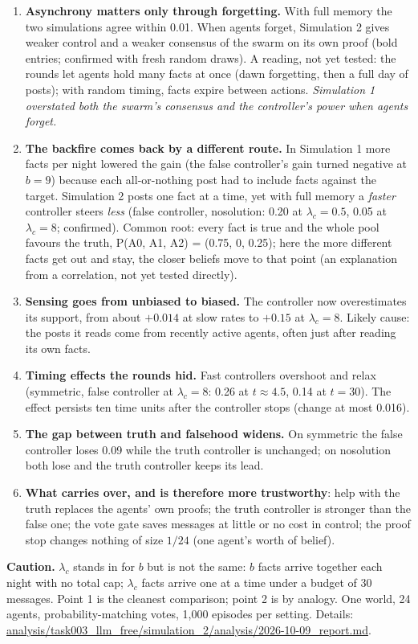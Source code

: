 \documentclass[10pt,a4paper]{article}
\begin{document}
\begin{enumerate}[label=\textbf{\arabic*.}]
\item \textbf{Asynchrony matters only through forgetting.} With full memory the two
  simulations agree within 0.01. When agents forget, Simulation 2 gives weaker control and a
  weaker consensus of the swarm on its own proof (bold entries; confirmed with fresh random
  draws). A reading, not yet tested: the rounds let agents hold many facts at once (dawn
  forgetting, then a full day of posts); with random timing, facts expire between actions.
  \emph{Simulation 1 overstated both the swarm's consensus and the controller's power when
  agents forget.}
\item \textbf{The backfire comes back by a different route.} In Simulation 1 more facts per
  night lowered the gain (the false controller's gain turned negative at $b = 9$) because each
  all-or-nothing post had to include facts against the target. Simulation 2 posts one fact at a
  time, yet with full memory a \emph{faster} controller steers \emph{less} (false controller,
  nosolution: 0.20 at $\lambda_c = 0.5$, 0.05 at $\lambda_c = 8$; confirmed). Common root: every
  fact is true and the whole pool favours the truth, P(A0, A1, A2) = (0.75, 0, 0.25); here the
  more different facts get out and stay, the closer beliefs move to that point (an explanation
  from a correlation, not yet tested directly).
\item \textbf{Sensing goes from unbiased to biased.} The controller now overestimates its
  support, from about $+0.014$ at slow rates to $+0.15$ at $\lambda_c = 8$. Likely cause: the
  posts it reads come from recently active agents, often just after reading its own facts.
\item \textbf{Timing effects the rounds hid.} Fast controllers overshoot and relax (symmetric,
  false controller at $\lambda_c = 8$: 0.26 at $t \approx 4.5$, 0.14 at $t = 30$). The effect
  persists ten time units after the controller stops (change at most 0.016).
\item \textbf{The gap between truth and falsehood widens.} On symmetric the false controller
  loses 0.09 while the truth controller is unchanged; on nosolution both lose and the truth
  controller keeps its lead.
\item \textbf{What carries over, and is therefore more trustworthy}: help with the truth
  replaces the agents' own proofs; the truth controller is stronger than the false one; the
  vote gate saves messages at little or no cost in control; the proof stop changes nothing
  of size $1/24$ (one agent's worth of belief).
\end{enumerate}

\noindent\textbf{Caution.} $\lambda_c$ stands in for $b$ but is not the same: $b$ facts arrive
together each night with no total cap; $\lambda_c$ facts arrive one at a time under a budget of
30 messages. Point 1 is the cleanest comparison; point 2 is by analogy. One world, 24 agents,
probability-matching votes, 1{,}000 episodes per setting. Details:
\url{analysis/task003_llm_free/simulation_2/analysis/2026-10-09_report.md}.
\end{document}
